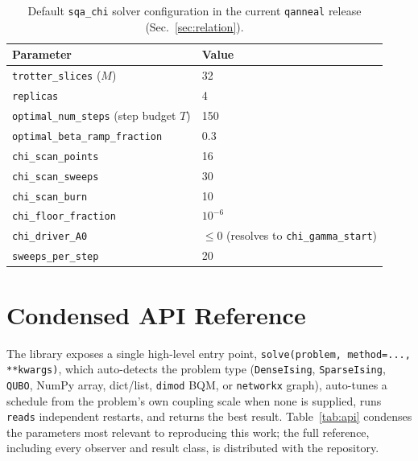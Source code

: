 \documentclass[11pt]{article}
\begin{document}
\begin{table}[h]
\centering
\caption{Default \texttt{sqa\_chi} solver configuration in the current \texttt{qanneal} release (Sec.~\ref{sec:relation}).}
\label{tab:repro}
\begin{tabular}{ll}
\toprule
Parameter & Value \\
\midrule
\texttt{trotter\_slices} ($M$) & 32 \\
\texttt{replicas} & 4 \\
\texttt{optimal\_num\_steps} (step budget $T$) & 150 \\
\texttt{optimal\_beta\_ramp\_fraction} & 0.3 \\
\texttt{chi\_scan\_points} & 16 \\
\texttt{chi\_scan\_sweeps} & 30 \\
\texttt{chi\_scan\_burn} & 10 \\
\texttt{chi\_floor\_fraction} & $10^{-6}$ \\
\texttt{chi\_driver\_A0} & $\le0$ (resolves to \texttt{chi\_gamma\_start}) \\
\texttt{sweeps\_per\_step} & 20 \\
\bottomrule
\end{tabular}
\end{table}

\section{Condensed API Reference}
\label{sec:api}

The library exposes a single high-level entry point, \texttt{solve(problem, method=...,
**kwargs)}, which auto-detects the problem type (\texttt{DenseIsing}, \texttt{SparseIsing},
\texttt{QUBO}, NumPy array, dict/list, \texttt{dimod} BQM, or \texttt{networkx} graph), auto-tunes
a schedule from the problem's own coupling scale when none is supplied, runs \texttt{reads}
independent restarts, and returns the best result. Table~\ref{tab:api} condenses the parameters
most relevant to reproducing this work; the full reference, including every observer and result
class, is distributed with the repository.
\end{document}
